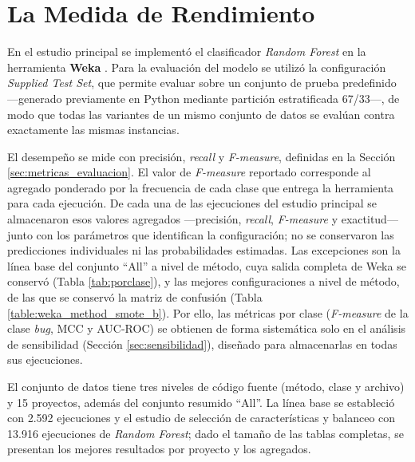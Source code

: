 \section{La Medida de Rendimiento}

En el estudio principal se implementó el clasificador \textit{Random Forest} en la herramienta \textbf{Weka} \cite{weka}. Para la evaluación del modelo se utilizó la configuración \textit{Supplied Test Set}, que permite evaluar sobre un conjunto de prueba predefinido ---generado previamente en Python mediante partición estratificada 67/33---, de modo que todas las variantes de un mismo conjunto de datos se evalúan contra exactamente las mismas instancias.

El desempeño se mide con precisión, \textit{recall} y \textit{F-measure}, definidas en la Sección \ref{sec:metricas_evaluacion}. El valor de \textit{F-measure} reportado corresponde al agregado ponderado por la frecuencia de cada clase que entrega la herramienta para cada ejecución. De cada una de las ejecuciones del estudio principal se almacenaron esos valores agregados ---precisión, \textit{recall}, \textit{F-measure} y exactitud--- junto con los parámetros que identifican la configuración; no se conservaron las predicciones individuales ni las probabilidades estimadas. Las excepciones son la línea base del conjunto ``All'' a nivel de método, cuya salida completa de Weka se conservó (Tabla \ref{tab:porclase}), y las mejores configuraciones a nivel de método, de las que se conservó la matriz de confusión (Tabla \ref{table:weka_method_smote_b}). Por ello, las métricas por clase (\textit{F-measure} de la clase \textit{bug}, MCC y AUC-ROC) se obtienen de forma sistemática solo en el análisis de sensibilidad (Sección \ref{sec:sensibilidad}), diseñado para almacenarlas en todas sus ejecuciones.

El conjunto de datos tiene tres niveles de código fuente (método, clase y archivo) y 15 proyectos, además del conjunto resumido ``All''. La línea base se estableció con 2.592 ejecuciones y el estudio de selección de características y balanceo con 13.916 ejecuciones de \textit{Random Forest}; dado el tamaño de las tablas completas, se presentan los mejores resultados por proyecto y los agregados.













\newpage

